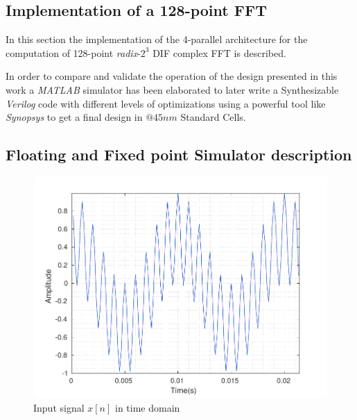 \documentclass[journal,comsoc]{IEEEtran}
\begin{document}
 
\subsection{Implementation of a 128-point FFT}
In this section the implementation of the 4-parallel architecture for the computation of 128-point \textit{radix}-$2^3$ DIF complex FFT is described.



In order to compare and validate the operation of the design presented in this work a \textit{MATLAB} simulator has been elaborated to later write  a Synthesizable \textit{Verilog} code with different levels of optimizations using a powerful tool like \textit{Synopsys} to get a final design in $@45nm$ Standard Cells.

\subsection{Floating and Fixed point Simulator description}


\begin{figure}%
	\centering
	\includegraphics[width=0.92\linewidth]{Diagramas/DftInputSignal.pdf}
	\caption{Input signal $x[n]$ in time domain}
	\label{fig:dftinputsignal}
\end{figure}
\end{document}
